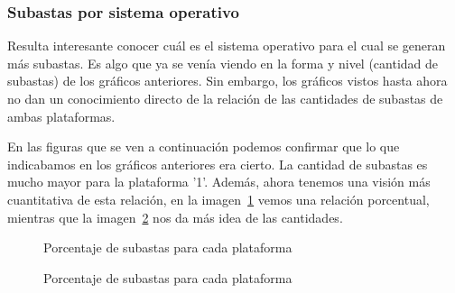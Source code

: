 \documentclass[a4paper, 12pt]{article}
\begin{document}
	\subsubsection{Subastas por sistema operativo}
	 Resulta interesante conocer cuál es el sistema operativo para el cual se generan más subastas. Es algo que ya se venía viendo en la forma y nivel (cantidad de subastas) de los gráficos anteriores. Sin embargo, los gráficos vistos hasta ahora no dan un conocimiento directo de la relación de las cantidades de subastas de ambas plataformas.

	 En las figuras que se ven a continuación podemos confirmar que lo que indicabamos en los gráficos anteriores era cierto. La cantidad de subastas es mucho mayor para la plataforma '1'. Además, ahora tenemos una visión más cuantitativa de esta relación, en la imagen~\ref{subastasSOporcentajes} vemos una relación porcentual, mientras que la imagen~\ref{subastasSOcantidades} nos da más idea de las cantidades.

	
		\begin{figure}[H]
			\centering
		   	\caption{Porcentaje de subastas para cada plataforma}
			\label{subastasSOporcentajes}
		\end{figure}



		\begin{figure}[H]
			\centering
		   	\caption{Porcentaje de subastas para cada plataforma}
			\label{subastasSOcantidades}
		\end{figure}
\end{document}
